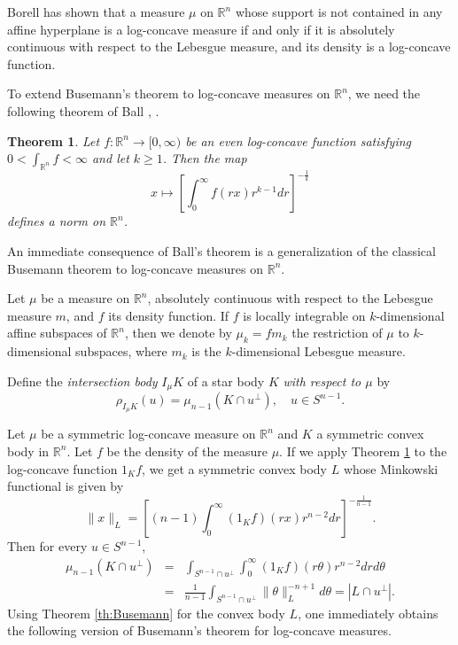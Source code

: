 \documentclass[12pt]{amsart} %
\newtheorem{theorem}{Theorem}
\renewcommand{\[}{\left[}
\renewcommand{\(}{\left(}
\renewcommand{\]}{\right]}
\renewcommand{\)}{\right)}
\renewcommand{\ge}{\geqslant}
\newcommand{\R}{\mathbb R}              %
\begin{document}
Borell \cite{Bor} has shown that a measure $\mu$ on $\mathbb R^n$ whose support is not contained
in any affine hyperplane is a log-concave measure if and only if it is
absolutely continuous with respect to the Lebesgue measure, and its
density is a log-concave function.




To extend Busemann's theorem to log-concave measures on $\R^n$, we need the following theorem of Ball \cite{Ba1}, \cite{Ba2}.

\begin{theorem} \label{th:ball}
Let $f:\R^n\rightarrow [0,\infty)$ be an even log-concave function satisfying $0<\int_{\mathbb R^n} f <\infty$ and let $k\ge 1$. Then the map
$$
x \longmapsto \[\int_0^\infty f(rx)r^{k-1}dr\]^{-\frac 1k}
$$
defines a norm on $\R^n$.
\end{theorem}


An immediate consequence of Ball's theorem is a generalization of the classical Busemann theorem to log-concave measures on $\R^n$.


 Let $\mu$ be a measure on $\R^n$, absolutely continuous  with respect to the Lebesgue measure $m$, and $f$   its density function.
 If $f$ is locally integrable on $k$-dimensional affine subspaces of $\R^n$, then we denote by $\mu_k = f m_k$ the restriction of $\mu$ to $k$-dimensional subspaces, where $m_k$ is the $k$-dimensional Lebesgue measure.

Define the {\em intersection body} $I_\mu K$ of a star body $K$ {\em with respect to $\mu$} by
$$
\rho_{I_\mu K}(u) = \mu_{n-1}(K\cap u^\bot),\quad u \in S^{n-1}.
$$

Let $\mu$ be a symmetric  log-concave measure on $\R^n$ and $K$ a symmetric convex body in $\R^n$.
Let $f$ be the density of the measure $\mu$. If we apply Theorem \ref{th:ball} to the log-concave function $1_K f$, we get a symmetric convex body $L$ whose Minkowski functional is given by $$\|x\|_L = \[(n-1)\int_0^\infty (1_K f)(rx)r^{n-2}dr\]^{-\frac{1}{n-1}}.$$ Then for every $u \in S^{n-1}$,
\begin{eqnarray*}
\mu_{n-1}(K\cap u^\perp) &=& \int_{S^{n-1}\cap u^\perp}\int_0^\infty (1_K f)(r\theta)r^{n-2} dr d\theta \\
&=& \frac{1}{n-1}  \int_{S^{n-1}\cap u^\perp} \|\theta\|_L^{-n+1} d\theta = |L\cap u^\perp|.
\end{eqnarray*}
Using   Theorem \ref{th:Busemann} for the convex body $L$,  one immediately obtains the following version of Busemann's theorem for log-concave measures.
\end{document}

